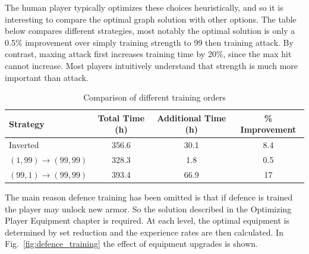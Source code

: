 	The human player typically optimizes these choices heuristically, and so it is interesting to compare the optimal graph solution with other options. The table below compares different strategies, most notably the optimal solution is only a 0.5\% improvement over simply training strength to 99 then training attack. By contrast, maxing attack first increases training time by 20\%, since the max hit cannot increase. Most players intuitively understand that strength is much more important than attack.

	\begin{table}[h!]
		\centering
		\begin{tabular}{|l|c|c|c|}
		\hline
		\textbf{Strategy} & \textbf{Total Time (h)} & \textbf{Additional Time (h)} & \textbf{\% Improvement} \\
		\hline
		Inverted & 356.6 & 30.1 & 8.4 \\
		\hline
		$(1, 99) \to (99, 99)$ & 328.3 & 1.8 & 0.5 \\
		\hline
		$(99, 1) \to (99, 99)$ & 393.4 & 66.9 & 17 \\
		\hline
		\end{tabular}
		\caption{Comparison of different training orders}
		\label{table:1}
	\end{table}


	The main reason defence training has been omitted is that if defence is trained the player may unlock new armor. So the solution described in the Optimizing Player Equipment chapter is required. At each level, the optimal equipment is determined by set reduction and the experience rates are then calculated. In Fig.~\ref{fig:defence_training} the effect of equipment upgrades is shown.

